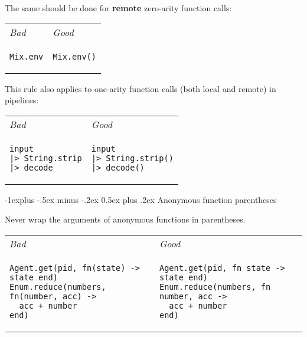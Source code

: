 \documentclass[10pt,landscape]{article}
\makeatletter
\renewcommand{\subsection}{\@startsection{subsection}{2}{0mm}%
                                {-1explus -.5ex minus -.2ex}%
                                {0.5ex plus .2ex}%
                                {\normalfont\normalsize\bfseries}}
\newcommand{\verbatimfont}[1]{\renewcommand{\verbatim@font}{\ttfamily#1}}
\makeatother
\begin{document}
\begin{multicols}{3}
The same should be done for \textbf{remote} zero-arity function calls:

\begin{tabular}{l|l}
\textit{Bad} & \textit{Good} \\
\begin{minipage}{.4\linewidth}
\begin{verbatim}
Mix.env
\end{verbatim}
\end{minipage}
&
\begin{minipage}{.6\linewidth}
\begin{verbatim}
Mix.env()
\end{verbatim}
\end{minipage}
\end{tabular}

This rule also applies to one-arity function calls (both local and remote) in pipelines:

\begin{tabular}{l|l}
\textit{Bad} & \textit{Good} \\
\begin{minipage}{.4\linewidth}
\begin{verbatim}
input
|> String.strip
|> decode
\end{verbatim}
\end{minipage}
&
\begin{minipage}{.6\linewidth}
\begin{verbatim}
input
|> String.strip()
|> decode()
\end{verbatim}
\end{minipage}
\end{tabular}

\subsection{Anonymous function parentheses}

Never wrap the arguments of anonymous functions in parentheses.

\begin{tabular}{l|l}
\textit{Bad} & \textit{Good} \\
\begin{minipage}{.47\linewidth}
\verbatimfont{\tiny}
\begin{verbatim}
Agent.get(pid, fn(state) -> state end)
Enum.reduce(numbers, fn(number, acc) ->
  acc + number
end)
\end{verbatim}
\end{minipage}
&
\begin{minipage}{.53\linewidth}
\verbatimfont{\tiny}
\begin{verbatim}
Agent.get(pid, fn state -> state end)
Enum.reduce(numbers, fn number, acc ->
  acc + number
end)
\end{verbatim}
\end{minipage}
\end{tabular}


\end{multicols}
\end{document}
